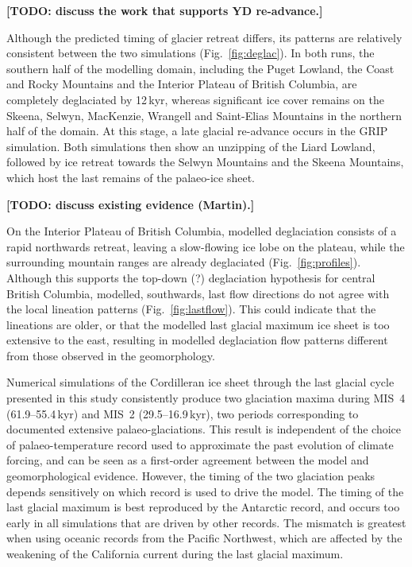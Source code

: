 \documentclass[tc, manuscript]{copernicus}
\newcommand{\todo}[1]{\textbf{[TODO: #1]}}
\begin{document}
\todo{discuss the work that supports YD re-advance.}

Although the predicted timing of glacier retreat differs, its patterns are
relatively consistent between the two simulations (Fig.~\ref{fig:deglac}). In
both runs, the southern half of the modelling domain, including the Puget
Lowland, the Coast and Rocky Mountains and the Interior Plateau of British
Columbia, are completely deglaciated by 12\,kyr, whereas significant
ice cover remains on the Skeena, Selwyn, MacKenzie, Wrangell and Saint-Elias Mountains
in the northern half of the domain. At this stage, a late glacial re-advance
occurs in the GRIP simulation. Both simulations then show an unzipping of the
Liard Lowland, followed by ice retreat towards the Selwyn Mountains and the
Skeena Mountains, which host the last remains of the palaeo-ice sheet.

\todo{discuss existing evidence (Martin).}

On the Interior Plateau of British Columbia, modelled deglaciation consists of
a rapid northwards retreat, leaving a slow-flowing ice lobe on the
plateau, while the surrounding mountain ranges are already deglaciated
(Fig.~\ref{fig:profiles}). Although this supports the top-down (?)
deglaciation hypothesis for central British Columbia, modelled, southwards,
last flow directions do not agree with the local lineation patterns
(Fig.~\ref{fig:lastflow}). This could indicate that the lineations are older,
or that the modelled last glacial maximum ice sheet is too extensive to the
east, resulting in modelled deglaciation flow patterns different from those
observed in the geomorphology.

\conclusions
\label{sec:concl}

Numerical simulations of the Cordilleran ice sheet through the last glacial
cycle presented in this study consistently produce two glaciation maxima during
MIS~4 (61.9--55.4\,kyr) and MIS~2 (29.5--16.9\,kyr), two periods
corresponding to documented extensive palaeo-glaciations. This result is
independent of the choice of palaeo-temperature record used to approximate the
past evolution of climate forcing, and
can be seen as a first-order agreement between the model and geomorphological
evidence. However, the timing of the two glaciation peaks depends sensitively
on which record
is used to drive the model. The timing of the last glacial maximum is best
reproduced by the Antarctic record, and occurs too early in all simulations
that are driven by other records. The mismatch is greatest when using
oceanic records from the Pacific Northwest, which are affected by the
weakening of the California current during the last glacial maximum.
\end{document}
